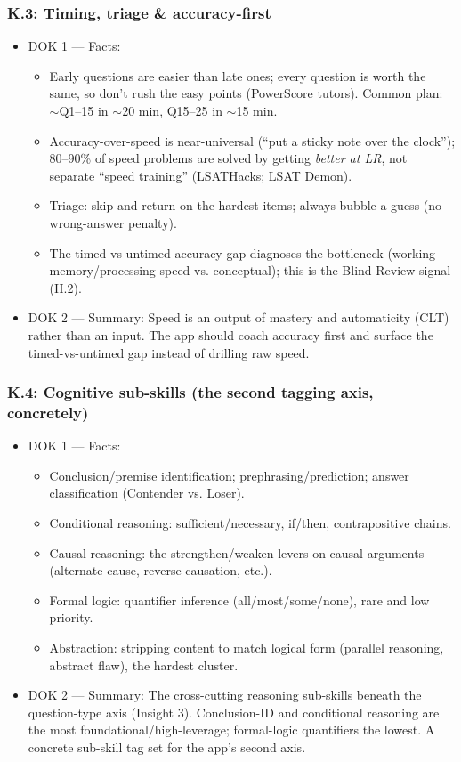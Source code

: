 \documentclass[11pt]{article}
\begin{document}
\subsubsection*{K.3: Timing, triage \& accuracy-first}
\begin{itemize}
\item DOK 1 --- Facts:
\begin{itemize}
\item Early questions are easier than late ones; every question is worth the same, so don't rush the easy points (PowerScore tutors). Common plan: $\sim$Q1--15 in $\sim$20 min, Q15--25 in $\sim$15 min.
\item Accuracy-over-speed is near-universal (\enquote{put a sticky note over the clock}); 80--90\% of speed problems are solved by getting \textit{better at LR}, not separate \enquote{speed training} (LSATHacks; LSAT Demon).
\item Triage: skip-and-return on the hardest items; always bubble a guess (no wrong-answer penalty).
\item The timed-vs-untimed accuracy gap diagnoses the bottleneck (working-memory/processing-speed vs. conceptual); this is the Blind Review signal (H.2).
\end{itemize}
\item DOK 2 --- Summary: Speed is an output of mastery and automaticity (CLT) rather than an input. The app should coach accuracy first and surface the timed-vs-untimed gap instead of drilling raw speed.
\end{itemize}
\subsubsection*{K.4: Cognitive sub-skills (the second tagging axis, concretely)}
\begin{itemize}
\item DOK 1 --- Facts:
\begin{itemize}
\item Conclusion/premise identification; prephrasing/prediction; answer classification (Contender vs. Loser).
\item Conditional reasoning: sufficient/necessary, if/then, contrapositive chains.
\item Causal reasoning: the strengthen/weaken levers on causal arguments (alternate cause, reverse causation, etc.).
\item Formal logic: quantifier inference (all/most/some/none), rare and low priority.
\item Abstraction: stripping content to match logical form (parallel reasoning, abstract flaw), the hardest cluster.
\end{itemize}
\item DOK 2 --- Summary: The cross-cutting reasoning sub-skills beneath the question-type axis (Insight 3). Conclusion-ID and conditional reasoning are the most foundational/high-leverage; formal-logic quantifiers the lowest. A concrete sub-skill tag set for the app's second axis.
\end{itemize}
\end{document}
